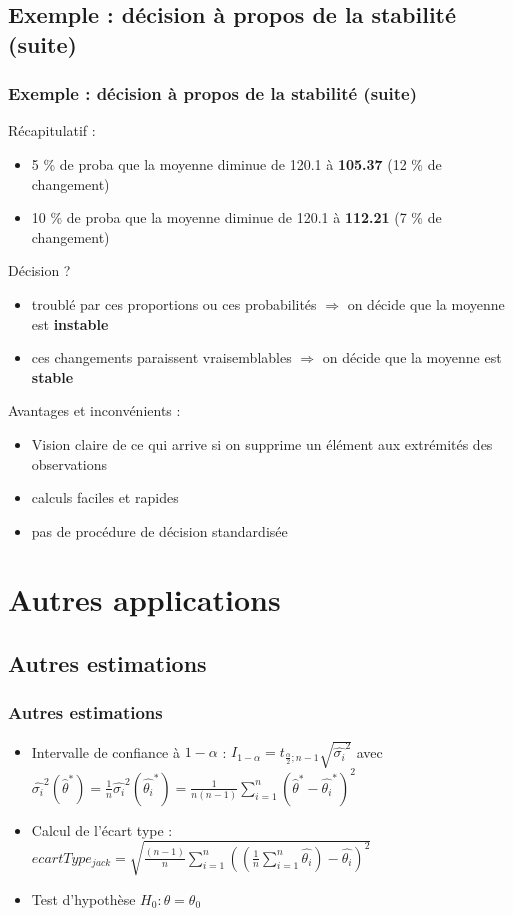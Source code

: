 \documentclass[handout]{beamer}
\begin{document}
		\subsection{Exemple : décision à propos de la stabilité (suite)}
		\begin{frame}
			\frametitle{Exemple : décision à propos de la stabilité (suite)}
			Récapitulatif :
			\begin{itemize}
				\item 5 \% de proba que la moyenne diminue de 120.1 à \textbf{105.37} (12 \% de changement)
				\item 10 \% de proba que la moyenne diminue de 120.1 à \textbf{112.21} (7 \% de changement)
			\end{itemize}

			\vspace{5px}
			Décision ?
			\begin{itemize}
				\item troublé par ces proportions ou ces probabilités $\Rightarrow$ on décide que la moyenne est \textbf{instable}
				\item ces changements paraissent vraisemblables $\Rightarrow$ on décide que la moyenne est \textbf{stable}
			\end{itemize}

			\vspace{5px}
			Avantages et inconvénients :
			\begin{itemize}
				\item Vision claire de ce qui arrive si on supprime un élément aux extrémités des observations
				\item calculs faciles et rapides
				\item pas de procédure de décision standardisée
			\end{itemize}
		\end{frame}


		\section{Autres applications}
		\subsection{Autres estimations}
		\begin{frame}
			\frametitle{Autres estimations}
			\begin{itemize}
				\item Intervalle de confiance à $1 - \alpha$ : $I_{1 - \alpha} = t_{\frac{\alpha}{2};n-1}\sqrt{\hat{\sigma_i}^2}$ avec $\hat{\sigma_i}^2(\hat{\theta}^*) = \frac{1}{n}\hat{\sigma_i}^2(\hat{\theta_i}^*) = \frac{1}{n(n-1)}\sum\limits_{i=1}^n (\hat{\theta}^* - \hat{\theta_i}^*)^2$
				\item Calcul de l'écart type : $ecartType_{jack} = \sqrt{\frac{(n - 1)}{n} \sum\limits_{i=1}^n ((\frac{1}{n} \sum\limits_{i=1}^n \hat{\theta_i}) - \hat{\theta_i})^2}$
				\item Test d'hypothèse $H_0 : \theta = \theta_0$
			\end{itemize}
		\end{frame}
\end{document}
